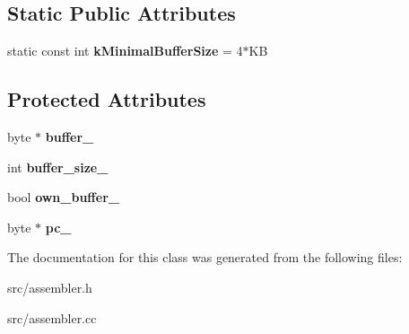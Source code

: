 \subsection*{Static Public Attributes}
\begin{DoxyCompactItemize}
\item 
\hypertarget{classv8_1_1internal_1_1_assembler_base_a58ac353bfad9e4a1206864e76baec7f8}{}static const int {\bfseries k\+Minimal\+Buffer\+Size} = 4$\ast$K\+B\label{classv8_1_1internal_1_1_assembler_base_a58ac353bfad9e4a1206864e76baec7f8}

\end{DoxyCompactItemize}
\subsection*{Protected Attributes}
\begin{DoxyCompactItemize}
\item 
\hypertarget{classv8_1_1internal_1_1_assembler_base_ad344ab4ee5927986bb2c17e63aa5a976}{}byte $\ast$ {\bfseries buffer\+\_\+}\label{classv8_1_1internal_1_1_assembler_base_ad344ab4ee5927986bb2c17e63aa5a976}

\item 
\hypertarget{classv8_1_1internal_1_1_assembler_base_a83cced380ff671163b1969b2ed2aa33c}{}int {\bfseries buffer\+\_\+size\+\_\+}\label{classv8_1_1internal_1_1_assembler_base_a83cced380ff671163b1969b2ed2aa33c}

\item 
\hypertarget{classv8_1_1internal_1_1_assembler_base_a9ec9983a6ada967f6b1d03551b2615d2}{}bool {\bfseries own\+\_\+buffer\+\_\+}\label{classv8_1_1internal_1_1_assembler_base_a9ec9983a6ada967f6b1d03551b2615d2}

\item 
\hypertarget{classv8_1_1internal_1_1_assembler_base_ae4d9536957f5e1b5336125b9c5c4d2f8}{}byte $\ast$ {\bfseries pc\+\_\+}\label{classv8_1_1internal_1_1_assembler_base_ae4d9536957f5e1b5336125b9c5c4d2f8}

\end{DoxyCompactItemize}


The documentation for this class was generated from the following files\+:\begin{DoxyCompactItemize}
\item 
src/assembler.\+h\item 
src/assembler.\+cc\end{DoxyCompactItemize}
